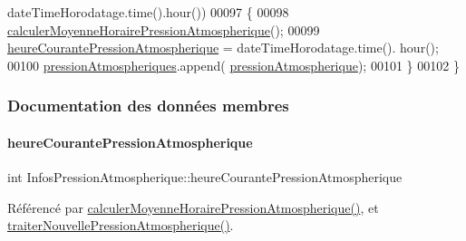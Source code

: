\begin{DoxyCode}
      dateTimeHorodatage.time().hour())
00097     \{
00098         \hyperlink{class_infos_pression_atmospherique_a287f1f24726218868c8531365c1a22ec}{calculerMoyenneHorairePressionAtmospherique}();
00099         \hyperlink{class_infos_pression_atmospherique_ab3fa5c89841cf03f371ef7848b8bc958}{heureCourantePressionAtmospherique} = dateTimeHorodatage.time().
      hour();
00100         \hyperlink{class_infos_pression_atmospherique_a38218b11dc9fb22aca7525f93155a26c}{pressionAtmospheriques}.append(
      \hyperlink{class_infos_pression_atmospherique_a69f31dc0d0ef59f8ced23e4663ee1ab8}{pressionAtmospherique});
00101     \}
00102 \}
\end{DoxyCode}


\subsubsection{Documentation des données membres}
\mbox{\label{class_infos_pression_atmospherique_ab3fa5c89841cf03f371ef7848b8bc958}} 
\paragraph{\texorpdfstring{heure\+Courante\+Pression\+Atmospherique}{heureCourantePressionAtmospherique}}
{\footnotesize\ttfamily int Infos\+Pression\+Atmospherique\+::heure\+Courante\+Pression\+Atmospherique\hspace{0.3cm}{\ttfamily [private]}}



Référencé par \hyperlink{class_infos_pression_atmospherique_a287f1f24726218868c8531365c1a22ec}{calculer\+Moyenne\+Horaire\+Pression\+Atmospherique()}, et \hyperlink{class_infos_pression_atmospherique_ab280f47f2a1376222a45fde8638489d2}{traiter\+Nouvelle\+Pression\+Atmospherique()}.

\mbox{\label{class_infos_pression_atmospherique_aba207458a51a9290e4f2e0795983a44e}} 
